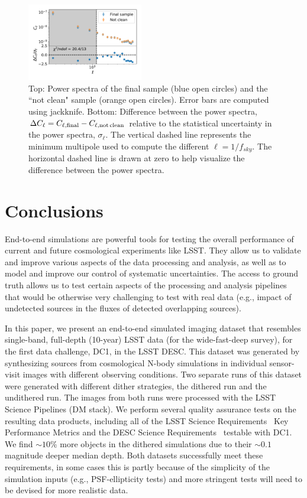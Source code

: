 \documentclass[a4paper,fleqn,usenatbib]{mnras}
\begin{document}
\begin{figure}
\centering
\includegraphics[width=0.45\textwidth]{figures/clean_no_clean}
\caption{Top: Power spectra of the final sample (blue open circles) and the ``not clean" sample (orange open circles). Error bars are computed using jackknife. Bottom: Difference between the power spectra, $\Delta C_{\ell} = C_{\ell, \rm{final}} - C_{\ell, \rm{not\, clean}}$ relative to the statistical uncertainty in the power spectra, $\sigma_{\ell}$. The vertical dashed line represents the minimum multipole used to compute the different $\ell = 1/f_{sky}$. The horizontal dashed line is drawn at zero to help visualize the difference between the power spectra.}
\label{fig:comparison_clean}
\end{figure}

\section{Conclusions}
\label{sec:conclusions}

End-to-end simulations are powerful tools for testing the overall performance of current and future cosmological experiments like LSST. They allow us to validate and improve various aspects of the data processing and analysis, as well as to model and improve our control of systematic uncertainties. The access to ground truth allows us to test certain aspects of the processing and analysis pipelines that would be otherwise very challenging to test with real data (e.g., impact of undetected sources in the fluxes of detected overlapping sources). 

In this paper, we present an end-to-end simulated imaging dataset that resembles single-band, full-depth (10-year) LSST data (for the wide-fast-deep survey), for the first data challenge, DC1, in the LSST DESC. This dataset was generated by synthesizing sources from cosmological N-body simulations in individual sensor-visit images with different observing conditions. Two separate runs of this dataset were generated with different dither strategies, the dithered run and the undithered run. The images from both runs were processed with the LSST Science Pipelines (DM stack). We perform several quality assurance tests on the resulting data products, including all of the LSST Science Requirements~\citep{LPM-17} Key Performance Metrics and the DESC Science Requirements~\citep{2018arXiv180901669T} testable with DC1. We find $\sim10$\% more objects in the dithered simulations due to their $\sim0.1$ magnitude deeper median depth. Both datasets successfully meet these requirements, in some cases this is partly because of the simplicity of the simulation inputs (e.g., PSF-ellipticity tests) and more stringent tests will need to be devised for more realistic data.
\end{document}
